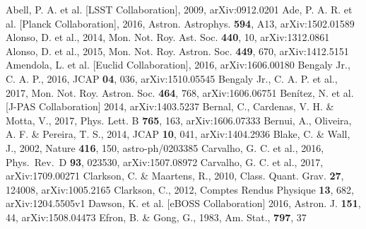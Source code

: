\documentclass[useAMS,usenatbib]{mn2e}
\begin{document}
\begin{thebibliography}{99}   %

Abell, P. A. et al. [LSST Collaboration], 2009, arXiv:0912.0201 
%
Ade, P. A. R. et al. [Planck Collaboration], 2016, Astron. Astrophys. {\bf 594}, A13, arXiv:1502.01589
%
Alonso, D. et al., 2014, Mon. Not. Roy. Ast. Soc. {\bf 440}, 10, arXiv:1312.0861
%
Alonso, D. et al., 2015, Mon. Not. Roy. Astron. Soc. {\bf 449}, 670, arXiv:1412.5151
%
Amendola, L. et al. [Euclid Collaboration], 2016, arXiv:1606.00180 
%
Bengaly Jr., C. A. P., 2016, JCAP {\bf 04}, 036, arXiv:1510.05545 
%
Bengaly Jr., C. A. P. et al., 2017, Mon. Not. Roy. Astron. Soc. {\bf 464}, 768, arXiv:1606.06751 
%
Ben\'itez, N. et al. [J-PAS Collaboration] 2014, arXiv:1403.5237 
%
Bernal, C., Cardenas, V. H. \& Motta, V., 2017, Phys. Lett. B {\bf 765}, 163, arXiv:1606.07333
%
Bernui, A., Oliveira, A. F. \& Pereira, T. S., 2014, JCAP {\bf 10}, 041, arXiv:1404.2936
%
Blake, C. \& Wall, J., 2002, Nature {\bf 416}, 150, astro-ph/0203385
%
Carvalho, G. C. et al., 2016, Phys.\ Rev.\ D {\bf 93},  023530, arXiv:1507.08972
%
Carvalho, G. C. et al., 2017, arXiv:1709.00271
%
Clarkson, C. \& Maartens, R., 2010, Class. Quant. Grav. {\bf 27}, 124008, arXiv:1005.2165
%
Clarkson, C., 2012, Comptes Rendus Physique {\bf 13}, 682, arXiv:1204.5505v1 
%
Dawson, K. et al. [eBOSS Collaboration] 2016, Astron. J. {\bf 151}, 44, arXiv:1508.04473
%
Efron, B. \& Gong, G., 1983, Am. Stat., {\bf 797}, 37

\end{thebibliography}
\end{document}
